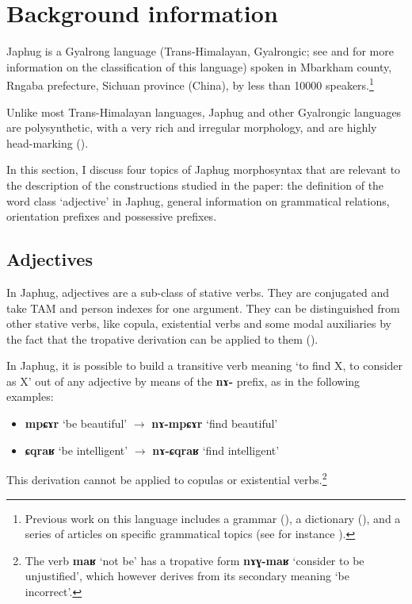 \documentclass[oneside,a4paper,11pt]{article}
\newcommand{\ipa}[1]{{\phon\textbf{#1}}} %
\begin{document}
\section{Background information} \label{sec:background}
Japhug is a Gyalrong language (Trans-Himalayan, Gyalrongic; see \citealt{jackson00sidaba} and \citealt{jacques.michaud11naish} for more information on the classification of this language) spoken in Mbarkham county, Rngaba prefecture, Sichuan province (China), by less than 10000 speakers.\footnote{Previous work on this language includes a grammar (\citealt{jacques08}), a dictionary (\citealt{jacques15japhug}), and a series of articles on specific grammatical topics (see for instance \citealt{jacques13harmonization, jacques14linking, jacques16relatives}). } 


Unlike most Trans-Himalayan languages, Japhug and other Gyalrongic languages are polysynthetic, with a very rich and irregular morphology, and are highly head-marking (\citealt{jacques13harmonization, jackson14morpho}).

In this section, I discuss four topics of Japhug morphosyntax that are relevant to the description of the constructions studied in the paper: the definition of the word class `adjective' in Japhug, general information on grammatical relations, orientation prefixes and possessive prefixes.


\subsection{Adjectives}
In Japhug, adjectives are a sub-class of stative verbs. They are conjugated and take TAM and person indexes for one argument. They can be distinguished from other stative verbs, like copula, existential verbs and some modal auxiliaries by the fact that the tropative derivation can be applied to them (\citealt{jacques13tropative}).

In Japhug, it is possible to build a transitive verb meaning `to find X, to consider as X' out of any adjective by means of the \ipa{nɤ-} prefix, as in the following examples:

\begin{itemize}
\item \ipa{mpɕɤr} `be beautiful' $\rightarrow$ \ipa{nɤ-mpɕɤr} `find beautiful'
\item \ipa{ɕqraʁ} `be intelligent' $\rightarrow$ \ipa{nɤ-ɕqraʁ} `find intelligent'
\end{itemize}

This derivation cannot be applied to copulas or existential verbs.\footnote{The verb \ipa{maʁ} `not be' has a tropative form \ipa{nɤɣ-maʁ} `consider to be unjustified', which however derives from its secondary meaning `be incorrect'.} 
\end{document}
